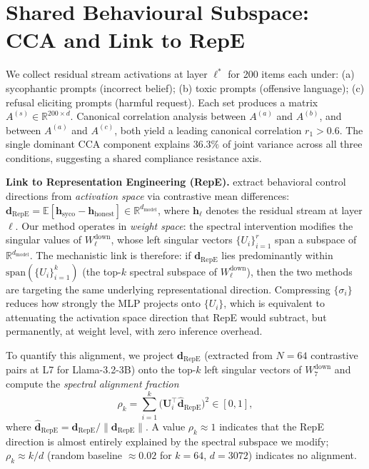 \documentclass{article}
\begin{document}
\section{Shared Behavioural Subspace: CCA and Link to RepE}
\label{app:cca}

We collect residual stream activations at layer $\ell^{*}$ for 200
items each under: (a) sycophantic prompts (incorrect belief);
(b) toxic prompts (offensive language); (c) refusal eliciting prompts
(harmful request). Each set produces a matrix
$A^{(s)}\in\mathbb{R}^{200\times d}$. Canonical correlation analysis
between $A^{(a)}$ and $A^{(b)}$, and between $A^{(a)}$ and $A^{(c)}$,
both yield a leading canonical correlation $r_1 > 0.6$. The single
dominant CCA component explains $36.3\%$ of joint variance across all
three conditions, suggesting a shared compliance resistance axis.

\textbf{Link to Representation Engineering (RepE).}
\citet{zou2023representation} extract behavioral control directions
from \emph{activation space} via contrastive mean differences:
$\mathbf{d}_\mathrm{RepE} = \mathbb{E}[\mathbf{h}_\mathrm{syco}
- \mathbf{h}_\mathrm{honest}] \in \mathbb{R}^{d_\mathrm{model}}$,
where $\mathbf{h}_\ell$ denotes the residual stream at layer $\ell$.
Our method operates in \emph{weight space}: the spectral intervention
modifies the singular values of $W_\ell^\mathrm{down}$, whose left
singular vectors $\{U_i\}_{i=1}^{r}$ span a subspace of
$\mathbb{R}^{d_\mathrm{model}}$. The mechanistic link is therefore:
if $\mathbf{d}_\mathrm{RepE}$ lies predominantly within
$\mathrm{span}(\{U_i\}_{i=1}^{k})$ (the top-$k$ spectral subspace of
$W_\ell^\mathrm{down}$), then the two methods are targeting the same
underlying representational direction. Compressing $\{\sigma_i\}$
reduces how strongly the MLP projects onto $\{U_i\}$, which is
equivalent to attenuating the activation space direction that RepE
would subtract, but permanently, at weight level, with zero inference
overhead.

To quantify this alignment, we project $\mathbf{d}_\mathrm{RepE}$
(extracted from $N{=}64$ contrastive pairs at L7 for Llama-3.2-3B)
onto the top-$k$ left singular vectors of $W_7^\mathrm{down}$ and
compute the \emph{spectral alignment fraction}
\[
  \rho_k = \sum_{i=1}^{k}
    \bigl(\mathbf{U}_i^\top \hat{\mathbf{d}}_\mathrm{RepE}\bigr)^{2}
  \in [0,1],
\]
where $\hat{\mathbf{d}}_\mathrm{RepE} = \mathbf{d}_\mathrm{RepE}
/ \|\mathbf{d}_\mathrm{RepE}\|$. A value $\rho_k \approx 1$ indicates
that the RepE direction is almost entirely explained by the spectral
subspace we modify; $\rho_k \approx k/d$ (random baseline $\approx
0.02$ for $k{=}64$, $d{=}3072$) indicates no alignment.
\end{document}
